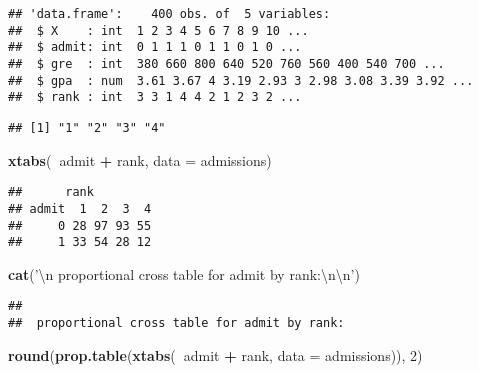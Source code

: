 \documentclass[]{article}
\newenvironment{Shaded}{\begin{snugshade}}{\end{snugshade}}
\newcommand{\CharTok}[1]{\textcolor[rgb]{0.31,0.60,0.02}{#1}}
\newcommand{\CommentTok}[1]{\textcolor[rgb]{0.56,0.35,0.01}{\textit{#1}}}
\newcommand{\DataTypeTok}[1]{\textcolor[rgb]{0.13,0.29,0.53}{#1}}
\newcommand{\DecValTok}[1]{\textcolor[rgb]{0.00,0.00,0.81}{#1}}
\newcommand{\KeywordTok}[1]{\textcolor[rgb]{0.13,0.29,0.53}{\textbf{#1}}}
\newcommand{\NormalTok}[1]{#1}
\newcommand{\OperatorTok}[1]{\textcolor[rgb]{0.81,0.36,0.00}{\textbf{#1}}}
\newcommand{\StringTok}[1]{\textcolor[rgb]{0.31,0.60,0.02}{#1}}
\begin{document}
\begin{verbatim}
## 'data.frame':    400 obs. of  5 variables:
##  $ X    : int  1 2 3 4 5 6 7 8 9 10 ...
##  $ admit: int  0 1 1 1 0 1 1 0 1 0 ...
##  $ gre  : int  380 660 800 640 520 760 560 400 540 700 ...
##  $ gpa  : num  3.61 3.67 4 3.19 2.93 3 2.98 3.08 3.39 3.92 ...
##  $ rank : int  3 3 1 4 4 2 1 2 3 2 ...
\end{verbatim}

\begin{Shaded}
\end{Shaded}

\begin{verbatim}
## [1] "1" "2" "3" "4"
\end{verbatim}

\begin{Shaded}
\begin{Highlighting}[]
\KeywordTok{xtabs}\NormalTok{(}\OperatorTok{~}\NormalTok{admit }\OperatorTok{+}\StringTok{ }\NormalTok{rank, }\DataTypeTok{data =}\NormalTok{ admissions)}
\end{Highlighting}
\end{Shaded}

\begin{verbatim}
##      rank
## admit  1  2  3  4
##     0 28 97 93 55
##     1 33 54 28 12
\end{verbatim}

\begin{Shaded}
\begin{Highlighting}[]
\KeywordTok{cat}\NormalTok{(}\StringTok{'}\CharTok{\textbackslash{}n}\StringTok{ proportional cross table for admit by rank:}\CharTok{\textbackslash{}n\textbackslash{}n}\StringTok{'}\NormalTok{)}
\end{Highlighting}
\end{Shaded}

\begin{verbatim}
## 
##  proportional cross table for admit by rank:
\end{verbatim}

\begin{Shaded}
\begin{Highlighting}[]
\KeywordTok{round}\NormalTok{(}\KeywordTok{prop.table}\NormalTok{(}\KeywordTok{xtabs}\NormalTok{(}\OperatorTok{~}\NormalTok{admit }\OperatorTok{+}\StringTok{ }\NormalTok{rank, }\DataTypeTok{data =}\NormalTok{ admissions)), }\DecValTok{2}\NormalTok{)}
\end{Highlighting}
\end{Shaded}
\end{document}

